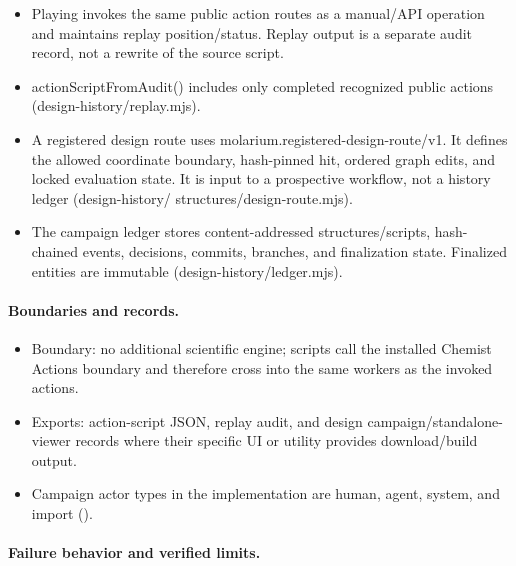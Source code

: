 \documentclass[11pt]{article}
\begin{document}
\begin{small}
\begin{itemize}[leftmargin=*]
\item Playing invokes the same public action routes as a manual/API operation and maintains replay position/status. Replay output is a separate audit record, not a rewrite of the source script.

\item actionScriptFromAudit() includes only completed recognized public actions (design-history/replay.mjs).

\item A registered design route uses molarium.registered-design-route/v1. It defines the allowed coordinate boundary, hash-pinned hit, ordered graph edits, and locked evaluation state. It is input to a prospective workflow, not a history ledger (design-history/ structures/design-route.mjs).

\item The campaign ledger stores content-addressed structures/scripts, hash-chained events, decisions, commits, branches, and finalization state. Finalized entities are immutable (design-history/ledger.mjs).

\end{itemize}

\paragraph{Boundaries and records.}

\begin{itemize}[leftmargin=*]

\item Boundary: no additional scientific engine; scripts call the installed Chemist Actions boundary and therefore cross into the same workers as the invoked actions.

\item Exports: action-script JSON, replay audit, and design campaign/standalone-viewer records where their specific UI or utility provides download/build output.

\item Campaign actor types in the implementation are human, agent, system, and import ().

\end{itemize}

\paragraph{Failure behavior and verified limits.}


\end{small}
\end{document}
